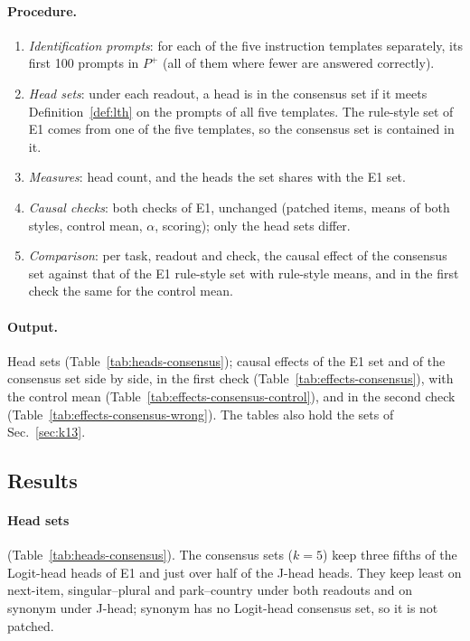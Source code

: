 \documentclass[11pt,a4paper]{article}
\begin{document}
\paragraph{Procedure.}
\begin{enumerate}
\item \emph{Identification prompts}: for each of the five instruction templates separately, its first 100 prompts in $P^{+}$ (all of them where fewer are answered correctly).
\item \emph{Head sets}: under each readout, a head is in the consensus set if it meets Definition~\ref{def:lth} on the prompts of all five templates. The rule-style set of E1 comes from one of the five templates, so the consensus set is contained in it.
\item \emph{Measures}: head count, and the heads the set shares with the E1 set.
\item \emph{Causal checks}: both checks of E1, unchanged (patched items, means of both styles, control mean, $\alpha$, scoring); only the head sets differ.
\item \emph{Comparison}: per task, readout and check, the causal effect of the consensus set against that of the E1 rule-style set with rule-style means, and in the first check the same for the control mean.
\end{enumerate}

\paragraph{Output.} Head sets (Table~\ref{tab:heads-consensus}); causal effects of the E1 set and of the consensus set side by side, in the first check (Table~\ref{tab:effects-consensus}), with the control mean (Table~\ref{tab:effects-consensus-control}), and in the second check (Table~\ref{tab:effects-consensus-wrong}). The tables also hold the sets of Sec.~\ref{sec:k13}.

\subsection{Results}\label{sec:res-consensus}
\paragraph{Head sets} (Table~\ref{tab:heads-consensus}). The consensus sets ($k=5$) keep three fifths of the Logit-head heads of E1 and just over half of the J-head heads. They keep least on next-item, singular--plural and park--country under both readouts and on synonym under J-head; synonym has no Logit-head consensus set, so it is not patched.
\end{document}
